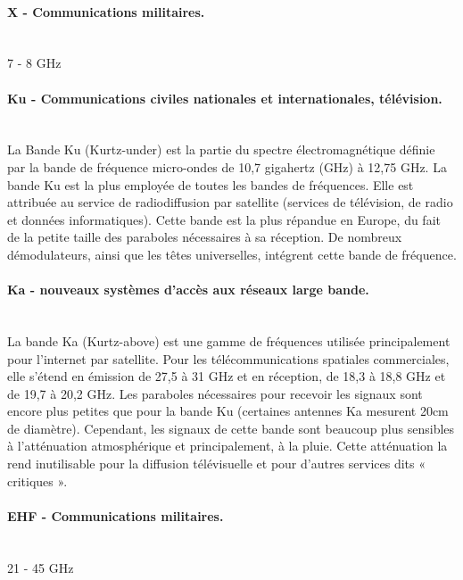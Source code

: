             \paragraph{X - Communications militaires.}~\\
            7  - 8 GHz  

            \paragraph{Ku - Communications civiles nationales et internationales, télévision.}~\\
                La Bande Ku (Kurtz-under) est la partie du spectre électromagnétique définie par la bande de fréquence micro-ondes de 10,7 gigahertz (GHz) à 12,75 GHz. La bande Ku est la plus employée de toutes les bandes de fréquences.
                Elle est attribuée au service de radiodiffusion par satellite (services de télévision, de radio et données informatiques). Cette bande est la plus répandue en Europe, du fait de la petite taille des paraboles nécessaires à sa réception.
                De nombreux démodulateurs, ainsi que les têtes universelles, intégrent cette bande de fréquence.
                            
            \paragraph{Ka - nouveaux systèmes d’accès aux réseaux large bande.}~\\
                La bande Ka (Kurtz-above) est une gamme de fréquences utilisée principalement pour l’internet par satellite. Pour les télécommunications spatiales commerciales, elle s’étend en émission de 27,5 à 31 GHz et en réception, de 18,3 à 18,8 GHz et de 19,7 à 20,2 GHz. Les paraboles nécessaires pour recevoir les signaux sont encore plus petites que pour la bande Ku (certaines antennes Ka mesurent 20cm de diamètre). Cependant, les signaux de cette bande sont beaucoup plus sensibles à l’atténuation atmosphérique et principalement, à la pluie. Cette atténuation la rend inutilisable pour la diffusion télévisuelle et pour d’autres services dits « critiques ».

            \paragraph{EHF - Communications militaires.}~\\
            21 - 45 GHz 
            
